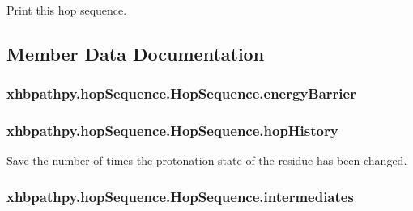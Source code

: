 Print this hop sequence. 



\subsection{Member Data Documentation}
\hypertarget{classxhbpathpy_1_1hop_sequence_1_1_hop_sequence_af3998fce6d2d3ee13d7767730c7f9991}{
\subsubsection[{energy\-Barrier}]{\setlength{\rightskip}{0pt plus 5cm}xhbpathpy.\-hop\-Sequence.\-Hop\-Sequence.\-energy\-Barrier}}\label{classxhbpathpy_1_1hop_sequence_1_1_hop_sequence_af3998fce6d2d3ee13d7767730c7f9991}
\hypertarget{classxhbpathpy_1_1hop_sequence_1_1_hop_sequence_a5b261819492711ec0ef1e15f433ba400}{
\subsubsection[{hop\-History}]{\setlength{\rightskip}{0pt plus 5cm}xhbpathpy.\-hop\-Sequence.\-Hop\-Sequence.\-hop\-History}}\label{classxhbpathpy_1_1hop_sequence_1_1_hop_sequence_a5b261819492711ec0ef1e15f433ba400}


Save the number of times the protonation state of the residue has been changed. 

\hypertarget{classxhbpathpy_1_1hop_sequence_1_1_hop_sequence_a45461fb5db5f5b061b07a75ebab4fa57}{
\subsubsection[{intermediates}]{\setlength{\rightskip}{0pt plus 5cm}xhbpathpy.\-hop\-Sequence.\-Hop\-Sequence.\-intermediates}}\label{classxhbpathpy_1_1hop_sequence_1_1_hop_sequence_a45461fb5db5f5b061b07a75ebab4fa57}


